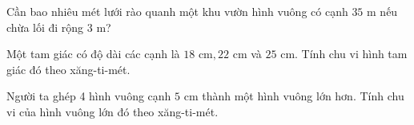 \begin{ex} %
Cần bao nhiêu mét lưới rào quanh một khu vườn hình vuông có cạnh $35\text{ m}$ nếu chừa lối đi rộng $3\text{ m}$?
\end{ex}

\begin{ex} %
Một tam giác có độ dài các cạnh là $18\text{ cm}, 22\text{ cm}$ và $25\text{ cm}$. Tính chu vi hình tam giác đó theo xăng-ti-mét.
\end{ex}

\begin{ex} %
Người ta ghép 4 hình vuông cạnh $5\text{ cm}$ thành một hình vuông lớn hơn. Tính chu vi của hình vuông lớn đó theo xăng-ti-mét.
\end{ex}
